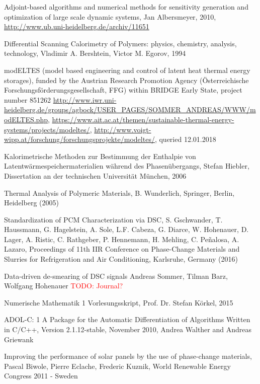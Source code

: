 \documentclass{scrartcl}[12pt, halfparskip]
\numberwithin{equation}{section}
\numberwithin{figure}{section}
\numberwithin{table}{section}
\newcommand{\todo}[1]{\textcolor{red}{TODO: #1}}
\begin{document}
\begin{thebibliography}{9}

	 Adjoint-based algorithms and numerical methods for sensitivity generation and optimization of large scale dynamic systems, 
	 Jan Albersmeyer, 2010,
	 \url{http://www.ub.uni-heidelberg.de/archiv/11651}

	Differential Scanning Calorimetry of Polymers: physics, chemistry, analysis, technology,
	Vladimir A. Bershtein, Victor M. Egorov,
	1994
	
	modELTES (model based engineering and control of latent heat thermal energy storages), 
	funded by the Austrian Research Promotion Agency (Österreichische Forschungsförderungsgesellschaft, FFG) within BRIDGE Early State, project number 851262
	\url{http://www.iwr.uni-heidelberg.de/groups/agbock/USER_PAGES/SOMMER_ANDREAS/WWW/modELTES.php}, 
	\url{https://www.ait.ac.at/themen/sustainable-thermal-energy-systems/projects/modeltes/}, 
	\url{http://www.voigt-wipp.at/forschung/forschungsprojekte/modeltes/}, queried 12.01.2018
	
	Kalorimetrische Methoden zur Bestimmung
	der Enthalpie von Latentwärmespeichermaterialien
	während des Phasenübergangs,
	Stefan Hiebler, Dissertation an der technischen Universität München, 2006
	
	Thermal Analysis of Polymeric Materials, 
	B. Wunderlich,
	Springer, Berlin, Heidelberg (2005)
	
	Standardization of PCM Characterization via DSC,
	S. Gschwander, T. Haussmann, G. Hagelstein, A. Sole, L.F. Cabeza, G. Diarce, W. Hohenauer, D. Lager, A. Ristic, C. Rathgeber, P. Hennemann, H. Mehling, C. Peñalosa, A. Lazaro,
	Proceedings of 11th IIR Conference on Phase-Change Materials and Slurries for Refrigeration and Air Conditioning, Karlsruhe, Germany (2016)
	
	Data-driven de-smearing of DSC signals
	Andreas Sommer, Tilman Barz, Wolfgang Hohenauer
	\todo{Journal?}
	
	Numerische Mathematik 1 Vorlesungsskript, 
	Prof. Dr. Stefan Körkel, 2015

	ADOL-C: 1
	A Package for the Automatic Differentiation
	of Algorithms Written in C/C++,
	Version 2.1.12-stable, November 2010,
	Andrea Walther and Andreas Griewank
	
	Improving the performance of solar panels by the use of phase-change materials,
	Pascal Biwole, Pierre Eclache, Frederic Kuznik,
	World Renewable Energy Congress 2011 - Sweden
	

\end{thebibliography}
\end{document}
